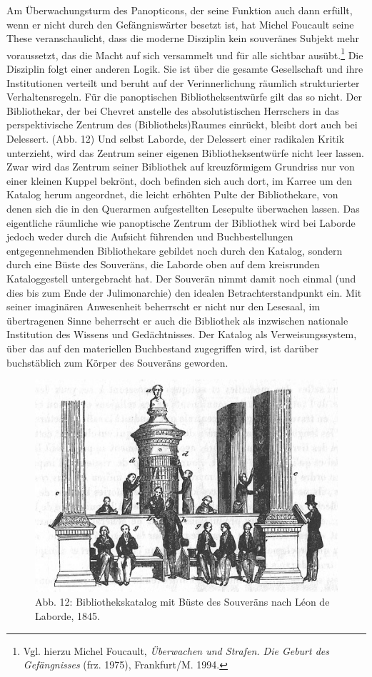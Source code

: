 Am Überwachungsturm des Panopticons, der seine Funktion auch dann
erfüllt, wenn er nicht durch den Gefängniswärter besetzt ist, hat Michel
Foucault seine These veranschaulicht, dass die moderne Disziplin kein
souveränes Subjekt mehr voraussetzt, das die Macht auf sich versammelt
und für alle sichtbar ausübt.\footnote{Vgl. hierzu Michel Foucault,
  \emph{Überwachen und Strafen. Die Geburt des Gefängnisses} (frz.
  1975), Frankfurt/M. 1994.} Die Disziplin folgt einer anderen Logik.
Sie ist über die gesamte Gesellschaft und ihre Institutionen verteilt
und beruht auf der Verinnerlichung räumlich strukturierter
Verhaltensregeln. Für die panoptischen Bibliotheksentwürfe gilt das so
nicht. Der Bibliothekar, der bei Chevret anstelle des absolutistischen
Herrschers in das perspektivische Zentrum des (Bibliotheks)Raumes
einrückt, bleibt dort auch bei Delessert. (Abb. 12) Und selbst Laborde,
der Delessert einer radikalen Kritik unterzieht, wird das Zentrum seiner
eigenen Bibliotheksentwürfe nicht leer lassen. Zwar wird das Zentrum
seiner Bibliothek auf kreuzförmigem Grundriss nur von einer kleinen
Kuppel bekrönt, doch befinden sich auch dort, im Karree um den Katalog
herum angeordnet, die leicht erhöhten Pulte der Bibliothekare, von denen
sich die in den Querarmen aufgestellten Lesepulte überwachen lassen. Das
eigentliche räumliche wie panoptische Zentrum der Bibliothek wird bei
Laborde jedoch weder durch die Aufsicht führenden und Buchbestellungen
entgegennehmenden Bibliothekare gebildet noch durch den Katalog, sondern
durch eine Büste des Souveräns, die Laborde oben auf dem kreisrunden
Kataloggestell untergebracht hat. Der Souverän nimmt damit noch einmal
(und dies bis zum Ende der Julimonarchie) den idealen
Betrachterstandpunkt ein. Mit seiner imaginären Anwesenheit beherrscht
er nicht nur den Lesesaal, im übertragenen Sinne beherrscht er auch die
Bibliothek als inzwischen nationale Institution des Wissens und
Gedächtnisses. Der Katalog als Verweisungssystem, über das auf den
materiellen Buchbestand zugegriffen wird, ist darüber buchstäblich zum
Körper des Souveräns geworden.

\begin{figure}[htbp]
\centering
\includegraphics{img/wagner-12.jpg}
\caption{Abb. 12: Bibliothekskatalog mit Büste des Souveräns nach Léon
de Laborde, 1845.}
\end{figure}

